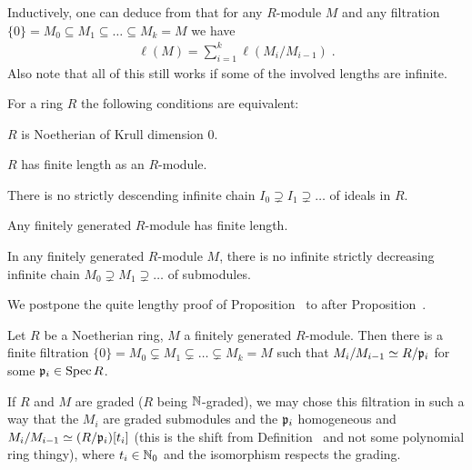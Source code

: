 \documentclass[a4paper,parskip=half,numbers=enddot, DIV=12]{scrreprt}
\begin{document}
\begin{rem}
\begin{alphanumerate}
        \item Inductively, one can deduce from  that for any $R$-module $M$ and any filtration $\{0\}=M_0\subseteq M_1\subseteq \ldots\subseteq M_k=M$ we have 
        \begin{align*}
        	\ell(M)=\sum_{i=1}^{k}\ell(M_i/M_{i-1})\;.
        \end{align*}
        Also note that all of this still works if some of the involved lengths are infinite.
    \end{alphanumerate}
\end{rem}
\begin{prop} 
    For a ring $R$ the following conditions are equivalent:
    \begin{alphanumerate}
    \item
        $R$ is Noetherian of Krull dimension $0$.
    \item  
        $R$ has finite length as an $R$-module.
    \item
        There is no strictly descending infinite chain $I_0\supsetneq I_1\supsetneq\ldots $ of ideals in $R$.
    \item
        Any finitely generated $R$-module has finite length.
    \item 
        In any finitely generated $R$-module $M$, there is no infinite strictly decreasing infinite chain $M_0\supsetneq M_1\supsetneq \ldots$ of submodules.
    \end{alphanumerate}
\end{prop}
We postpone the quite lengthy proof of Proposition~ to after Proposition~.
\begin{prop}
    \begin{alphanumerate}
    \item {}
        Let $R$ be a Noetherian ring, $M$ a finitely generated $R$-module. Then there is a finite filtration $\{0\} = M_0\subsetneq M_1\subsetneq\ldots\subsetneq M_k = M$ such that $M_i/M_{i-1} \simeq R/\mathfrak{p}_i$ for some $\mathfrak{p}_i\in \operatorname{Spec} R$.
    \item  
        If $R$ and $M$ are graded ($R$ being $\mathbb{N}$-graded), we may chose this filtration in such a way that the $M_i$ are graded submodules and the $\mathfrak{p}_i$ homogeneous and $M_i/M_{i-1} \simeq (R/\mathfrak{p}_i)[t_i]$ (this is the shift from Definition~ and not some polynomial ring thingy), where $t_i\in \mathbb{N}_0$ and the isomorphism respects the grading.
    \end{alphanumerate}
\end{prop}
\end{document}
